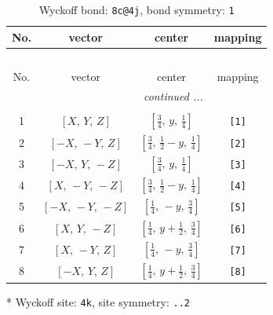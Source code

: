 \documentclass[fleqn,8pt]{jsarticle}
\begin{document}
\renewcommand{\arraystretch}{1.2}
\begin{longtable}{cccc}
\caption{Wyckoff bond: {\tt 8c@4j}, bond symmetry: {\tt 1}}
 \\
 \hline \hline
No. & vector & center & mapping \\ \hline \endfirsthead

\multicolumn{3}{l}{\tablename\ \thetable{}} \\
 \hline \hline
No. & vector & center & mapping \\ \hline \endhead

 \hline \hline
\multicolumn{3}{r}{\footnotesize\it continued ...} \\ \endfoot

 \hline \hline
\multicolumn{3}{r}{} \\ \endlastfoot

1 & $\left[ X,\, Y,\, Z \right]$ & $\left[ \frac{3}{4},\, y,\, \frac{1}{4} \right]$ & {\tt [1]} \\ \hline
2 & $\left[ - X,\, - Y,\, Z \right]$ & $\left[ \frac{3}{4},\, \frac{1}{2} - y,\, \frac{1}{4} \right]$ & {\tt [2]} \\ \hline
3 & $\left[ - X,\, Y,\, - Z \right]$ & $\left[ \frac{3}{4},\, y,\, \frac{1}{4} \right]$ & {\tt [3]} \\ \hline
4 & $\left[ X,\, - Y,\, - Z \right]$ & $\left[ \frac{3}{4},\, \frac{1}{2} - y,\, \frac{1}{4} \right]$ & {\tt [4]} \\ \hline
5 & $\left[ - X,\, - Y,\, - Z \right]$ & $\left[ \frac{1}{4},\, - y,\, \frac{3}{4} \right]$ & {\tt [5]} \\ \hline
6 & $\left[ X,\, Y,\, - Z \right]$ & $\left[ \frac{1}{4},\, y + \frac{1}{2},\, \frac{3}{4} \right]$ & {\tt [6]} \\ \hline
7 & $\left[ X,\, - Y,\, Z \right]$ & $\left[ \frac{1}{4},\, - y,\, \frac{3}{4} \right]$ & {\tt [7]} \\ \hline
8 & $\left[ - X,\, Y,\, Z \right]$ & $\left[ \frac{1}{4},\, y + \frac{1}{2},\, \frac{3}{4} \right]$ & {\tt [8]} \\
\end{longtable}
* Wyckoff site: {\tt 4k}, site symmetry: {\tt ..2}
\renewcommand{\arraystretch}{1.2}
\end{document}
